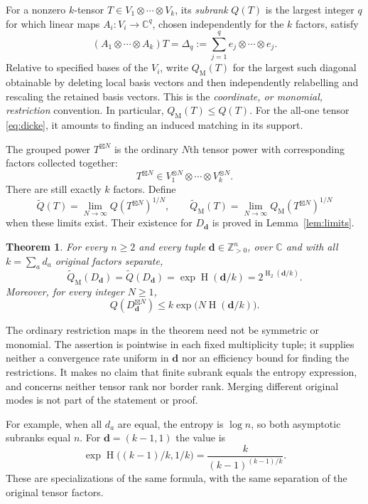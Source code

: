 \documentclass[10pt,a4paper]{article}
\newtheorem{theorem}{Theorem}[section]
\theoremstyle{definition}
\theoremstyle{remark}
\numberwithin{equation}{section}
\newcommand{\C}{\mathbb C}
\newcommand{\Qmon}{Q_{\mathrm M}}
\newcommand{\Qt}{\widetilde Q}
\newcommand{\Qmt}{\widetilde Q_{\mathrm M}}
\DeclareMathOperator{\HH}{H}
\begin{document}
For a nonzero $k$-tensor $T\in V_1\otimes\cdots\otimes V_k$, its
\emph{subrank} $Q(T)$ is the largest integer $q$ for which linear maps
$A_i:V_i\to\C^q$, chosen independently for the $k$ factors, satisfy
\[
 (A_1\otimes\cdots\otimes A_k)T
   =\Delta_q:=\sum_{j=1}^q e_j\otimes\cdots\otimes e_j.
\]
Relative to specified bases of the $V_i$, write $\Qmon(T)$ for the
largest such diagonal obtainable by deleting local basis vectors and
then independently relabelling and rescaling the retained basis vectors.
This is the \emph{coordinate, or monomial, restriction} convention.
In particular, $\Qmon(T)\leq Q(T)$. For the all-one tensor
\eqref{eq:dicke}, it amounts to finding an induced matching in its support.

The grouped power $T^{\boxtimes N}$ is the ordinary $N$th tensor power
with corresponding factors collected together:
\[
 T^{\boxtimes N}\in V_1^{\otimes N}\otimes\cdots\otimes V_k^{\otimes N}.
\]
There are still exactly $k$ factors. Define
\[
 \Qt(T)=\lim_{N\to\infty}Q(T^{\boxtimes N})^{1/N},\qquad
 \Qmt(T)=\lim_{N\to\infty}\Qmon(T^{\boxtimes N})^{1/N}
\]
when these limits exist. Their existence for $D_{\mathbf d}$ is proved
in Lemma~\ref{lem:limits}.

\begin{theorem}\label{thm:main}
For every $n\geq2$ and every tuple $\mathbf d\in\mathbb Z_{>0}^n$,
over $\C$ and with all $k=\sum_a d_a$ original factors separate,
\begin{equation}\label{eq:main}
 \Qmt(D_{\mathbf d})=\Qt(D_{\mathbf d})
       =\exp\HH(\mathbf d/k)=2^{\HH_2(\mathbf d/k)}.
\end{equation}
Moreover, for every integer $N\geq1$,
\begin{equation}\label{eq:finite-upper}
 Q(D_{\mathbf d}^{\boxtimes N})\leq k\exp\bigl(N\HH(\mathbf d/k)\bigr).
\end{equation}
\end{theorem}

The ordinary restriction maps in the theorem need not be symmetric or
monomial. The assertion is pointwise in each fixed multiplicity tuple;
it supplies neither a convergence rate uniform in $\mathbf d$ nor an
efficiency bound for finding the restrictions. It makes no claim that
finite subrank equals the entropy expression, and concerns neither
tensor rank nor border rank. Merging different original modes is not
part of the statement or proof.

For example, when all $d_a$ are equal, the entropy is $\log n$, so
both asymptotic subranks equal $n$. For $\mathbf d=(k-1,1)$ the value is
\[
 \exp\HH\bigl((k-1)/k,1/k\bigr)
   =\frac{k}{(k-1)^{(k-1)/k}}.
\]
These are specializations of the same formula, with the same separation
of the original tensor factors.
\end{document}
